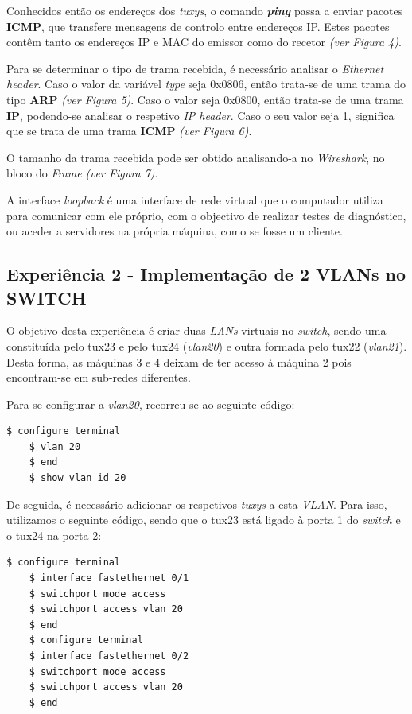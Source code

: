 \documentclass[11pt]{article}
\begin{document}
Conhecidos então os endereços dos \textit{tuxys}, o comando \textit{\textbf{ping}} passa a enviar pacotes \textbf{ICMP}, que transfere mensagens de controlo entre endereços IP. Estes pacotes contêm tanto os endereços IP e MAC do emissor como do recetor \textit{(ver Figura 4)}.

Para se determinar o tipo de trama recebida, é necessário analisar o \textit{Ethernet header}. Caso o valor da variável \textit{type} seja 0x0806, então trata-se de uma trama do tipo \textbf{ARP} \textit{(ver Figura 5)}. Caso o valor seja 0x0800, então trata-se de uma trama \textbf{IP}, podendo-se analisar o respetivo \textit{IP header}. Caso o seu valor seja 1, significa que se trata de uma trama \textbf{ICMP} \textit{(ver Figura 6)}.

O tamanho da trama recebida pode ser obtido analisando-a no \textit{Wireshark}, no bloco do \textit{Frame} \textit{(ver Figura 7)}.

A interface \textit{loopback} é uma interface de rede virtual que o computador utiliza para comunicar com ele próprio, com o objectivo de realizar testes de diagnóstico, ou aceder a servidores na própria máquina, como se fosse um cliente.

\subsection{Experiência 2 - Implementação de 2 VLANs no SWITCH}

O objetivo desta experiência é criar duas \textit{LANs} virtuais no \textit{switch}, sendo uma constituída pelo tux23 e pelo tux24 (\textit{vlan20}) e outra formada pelo tux22 (\textit{vlan21}). Desta forma, as máquinas 3 e 4 deixam de ter acesso à máquina 2 pois encontram-se em sub-redes diferentes.

Para se configurar a \textit{vlan20}, recorreu-se ao seguinte código: 

\begin{lstlisting}[language=bash]
    $ configure terminal
    $ vlan 20
    $ end
    $ show vlan id 20
\end{lstlisting}

De seguida, é necessário adicionar os respetivos \textit{tuxys} a esta \textit{VLAN}. Para isso, utilizamos o seguinte código, sendo que o tux23 está ligado à porta 1 do \textit{switch} e o tux24 na porta 2:

\begin{lstlisting}[language=bash]
    $ configure terminal
    $ interface fastethernet 0/1
    $ switchport mode access
    $ switchport access vlan 20
    $ end
    $ configure terminal
    $ interface fastethernet 0/2            
    $ switchport mode access
    $ switchport access vlan 20
    $ end
\end{lstlisting}
\end{document}
